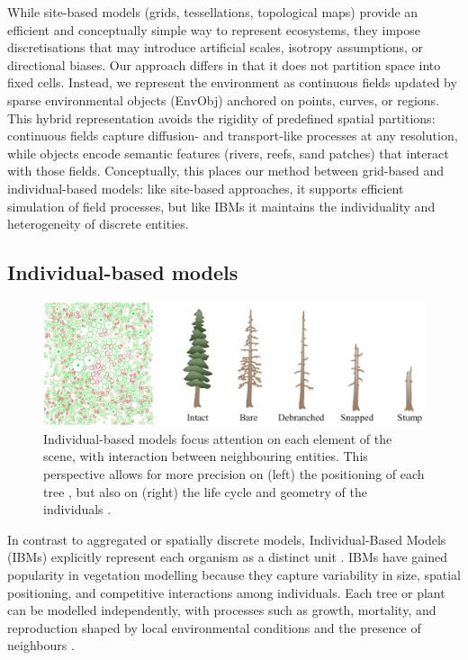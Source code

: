 While site-based models (grids, tessellations, topological maps) provide an efficient and conceptually simple way to represent ecosystems, they impose discretisations that may introduce artificial scales, isotropy assumptions, or directional biases. Our approach differs in that it does not partition space into fixed cells. Instead, we represent the environment as continuous fields updated by sparse environmental objects (EnvObj) anchored on points, curves, or regions. This hybrid representation avoids the rigidity of predefined spatial partitions: continuous fields capture diffusion- and transport-like processes at any resolution, while objects encode semantic features (rivers, reefs, sand patches) that interact with those fields. Conceptually, this places our method between grid-based and individual-based models: like site-based approaches, it supports efficient simulation of field processes, but like IBMs it maintains the individuality and heterogeneity of discrete entities.

\subsection{Individual-based models}

\begin{figure}
    \includegraphics[]{individual-based-modeling-teaser.png}
    \caption{Individual-based models focus attention on each element of the scene, with interaction between neighbouring entities. This perspective allows for more precision on (left) the positioning of each tree \cite{Alsweis2006}, but also on (right) the life cycle and geometry of the individuals \cite{Peytavie2024a}.}
    \label{fig:env-obj-individual-based-models}
\end{figure}

In contrast to aggregated or spatially discrete models, Individual-Based Models (IBMs) explicitly represent each organism as a distinct unit \cite{Crooks2017}. IBMs have gained popularity in vegetation modelling because they capture variability in size, spatial positioning, and competitive interactions among individuals. Each tree or plant can be modelled independently, with processes such as growth, mortality, and reproduction shaped by local environmental conditions and the presence of neighbours \cite{Chng2013,Peytavie2024a}.

